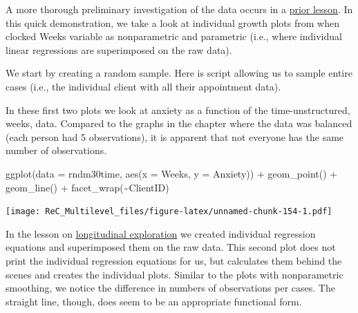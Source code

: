 \documentclass[
  11pt,
]{book}
\newenvironment{Shaded}{\begin{snugshade}}{\end{snugshade}}
\newcommand{\AttributeTok}[1]{\textcolor[rgb]{0.77,0.63,0.00}{#1}}
\newcommand{\DecValTok}[1]{\textcolor[rgb]{0.00,0.00,0.81}{#1}}
\newcommand{\FunctionTok}[1]{\textcolor[rgb]{0.00,0.00,0.00}{#1}}
\newcommand{\NormalTok}[1]{#1}
\newcommand{\OtherTok}[1]{\textcolor[rgb]{0.56,0.35,0.01}{#1}}
\newcommand{\SpecialCharTok}[1]{\textcolor[rgb]{0.00,0.00,0.00}{#1}}
\begin{document}
A more thorough preliminary investigation of the data occurs in a \protect\hyperlink{MLMexplore}{prior lesson}. In this quick demonstration, we take a look at individual growth plots from when clocked Weeks variable as nonparametric and parametric (i.e., where individual linear regressions are superimposed on the raw data).

We start by creating a random sample. Here is script allowing us to sample entire cases (i.e., the individual client with all their appointment data).

\begin{Shaded}
\end{Shaded}

In these first two plots we look at anxiety as a function of the time-unstructured, weeks, data. Compared to the graphs in the chapter where the data was balanced (each person had 5 observations), it is apparent that not everyone has the same number of observations.

\begin{Shaded}
\begin{Highlighting}[]
\FunctionTok{ggplot}\NormalTok{(}\AttributeTok{data =}\NormalTok{ rndm30time, }\FunctionTok{aes}\NormalTok{(}\AttributeTok{x =}\NormalTok{ Weeks, }\AttributeTok{y =}\NormalTok{ Anxiety)) }\SpecialCharTok{+} \FunctionTok{geom\_point}\NormalTok{() }\SpecialCharTok{+} \FunctionTok{geom\_line}\NormalTok{() }\SpecialCharTok{+}
    \FunctionTok{facet\_wrap}\NormalTok{(}\SpecialCharTok{\textasciitilde{}}\NormalTok{ClientID)}
\end{Highlighting}
\end{Shaded}

\texttt{[image: ReC\_Multilevel\_files/figure-latex/unnamed-chunk-154-1.pdf]}

In the lesson on \href{MLMexplore}{longitudinal exploration} we created individual regression equations and superimposed them on the raw data. This second plot does not print the individual regression equations for us, but calculates them behind the scenes and creates the individual plots. Similar to the plots with nonparametric smoothing, we notice the difference in numbers of observations per cases. The straight line, though, does seem to be an appropriate functional form.
\end{document}
